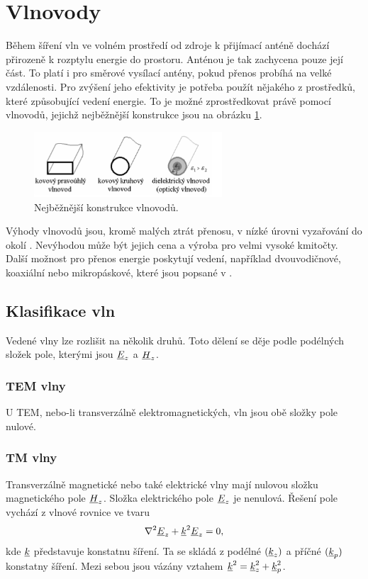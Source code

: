 \section{Vlnovody}
Během šíření vln ve volném prostředí od zdroje k přijímací anténě dochází přirozeně k rozptylu energie do prostoru. Anténou je tak zachycena pouze její část. To platí i pro směrové vysílací antény, pokud přenos probíhá na velké vzdálenosti. Pro zvýšení jeho efektivity je potřeba použít nějakého z prostředků, které způsobující vedení energie. To je možné zprostředkovat právě pomocí vlnovodů, jejichž nejběžnější konstrukce jsou na obrázku \ref{obr:evlny_vlnovody_konstrukce}. 
\begin{figure}[!h]
	\centering
	\includegraphics[width=7cm]{evlny_vlnovody_konstrukce.png}
	\caption{Nejběžnější konstrukce vlnovodů.}
	\label{obr:evlny_vlnovody_konstrukce}
\end{figure}
Výhody vlnovodů jsou, kromě malých ztrát přenosu, v nízké úrovni vyzařování do okolí  . Nevýhodou může být jejich cena a výroba pro velmi vysoké kmitočty. Další možnost pro přenos energie poskytují vedení, například dvouvodičnové, koaxiální nebo mikropáskové, které jsou popsané v \cite{emp}.

\subsection{Klasifikace vln}
Vedené vlny lze rozlišit na několik druhů. Toto dělení se děje podle podélných složek pole, kterými jsou ${\underline{E}}_{z}$ a ${\underline{H}}_{z}$.

\subsubsection*{TEM vlny}
U TEM, nebo-li transverzálně elektromagnetických, vln jsou obě složky pole nulové.
\subsubsection*{TM vlny}
Transverzálně magnetické nebo také elektrické vlny mají nulovou složku magnetického pole ${\underline{H}}_{z}$. Složka elektrického pole ${\underline{E}}_{z}$ je nenulová. Řešení pole vychází z vlnové rovnice ve tvaru
\begin{displaymath}
	\nabla^{2} {\underline{E}}_{z} + {\underline{k}}^{2}{\underline{E}}_{z} = 0,
\end{displaymath}
kde ${\underline{k}}$ představuje konstatnu šíření. Ta se skládá z podélné $({\underline{k}}_z)$ a příčné $({\underline{k}}_p)$ konstatny šíření. Mezi sebou jsou vázány vztahem ${\underline{k}}^{2} = {\underline{k}}_z^{2} + {\underline{k}}_p^{2}$.
